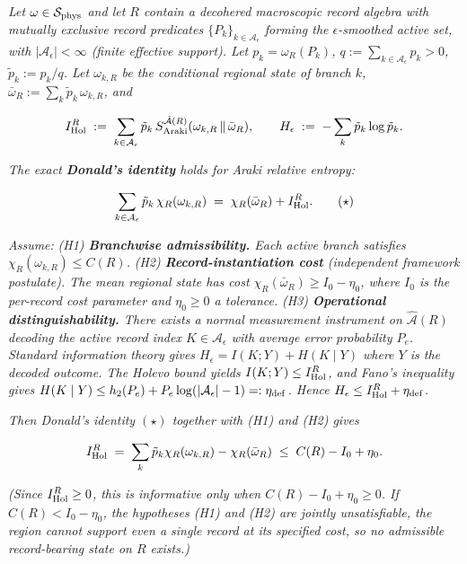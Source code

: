 \documentclass[11pt,a4paper]{article}
\begin{document}
\emph{Let $\omega \in \mathcal{S}_{\rm phys}$ and let $R$ contain a decohered macroscopic record algebra with mutually exclusive record predicates $\{P_k\}_{k \in \mathcal{A}_\epsilon}$ forming the $\epsilon$-smoothed active set, with $|\mathcal{A}_\epsilon| < \infty$ (finite effective support). Let $p_k = \omega_R(P_k)$, $q := \sum_{k \in \mathcal{A}_\epsilon} p_k > 0$, $\tilde p_k := p_k/q$. Let $\omega_{k,R}$ be the conditional regional state of branch $k$, $\bar\omega_R := \sum_k \tilde p_k \, \omega_{k,R}$, and}

\[
I_{\rm Hol}^R \;:=\; \sum_{k \in \mathcal{A}_\epsilon} \tilde p_k \, S^{\hat{\mathcal{A}}(R)}_{\rm Araki}(\omega_{k,R} \,\|\, \bar\omega_R), \qquad H_\epsilon \;:=\; -\sum_k \tilde p_k \log \tilde p_k.
\]

\emph{The exact \textbf{Donald's identity} holds for Araki relative entropy:}

\[
\sum_{k \in \mathcal{A}_\epsilon} \tilde p_k \, \chi_R(\omega_{k,R}) \;=\; \chi_R(\bar\omega_R) + I_{\rm Hol}^R. \tag{$\star$}
\]

\emph{Assume:}
\emph{(H1) \textbf{Branchwise admissibility.} Each active branch satisfies $\chi_R(\omega_{k,R}) \le C(R)$.}
\emph{(H2) \textbf{Record-instantiation cost} (independent framework postulate). The mean regional state has cost $\chi_R(\bar\omega_R) \ge I_0 - \eta_0$, where $I_0$ is the per-record cost parameter and $\eta_0 \ge 0$ a tolerance.}
\emph{(H3) \textbf{Operational distinguishability.} There exists a normal measurement instrument on $\hat{\mathcal{A}}(R)$ decoding the active record index $K \in \mathcal{A}_\epsilon$ with average error probability $P_e$. Standard information theory gives $H_\epsilon = I(K;Y) + H(K \mid Y)$ where $Y$ is the decoded outcome. The Holevo bound yields $I(K;Y) \le I_{\rm Hol}^R$, and Fano's inequality gives $H(K \mid Y) \le h_2(P_e) + P_e \log(|\mathcal{A}_\epsilon| - 1) =: \eta_{\rm def}$. Hence $H_\epsilon \le I_{\rm Hol}^R + \eta_{\rm def}$.}

\emph{Then Donald's identity $(\star)$ together with (H1) and (H2) gives}

\[
I_{\rm Hol}^R \;=\; \sum_k \tilde p_k \chi_R(\omega_{k,R}) - \chi_R(\bar\omega_R) \;\le\; C(R) - I_0 + \eta_0.
\]

\emph{(Since $I_{\rm Hol}^R \ge 0$, this is informative only when $C(R) - I_0 + \eta_0 \ge 0$. If $C(R) < I_0 - \eta_0$, the hypotheses (H1) and (H2) are jointly unsatisfiable, the region cannot support even a single record at its specified cost, so no admissible record-bearing state on $R$ exists.)}
\end{document}
